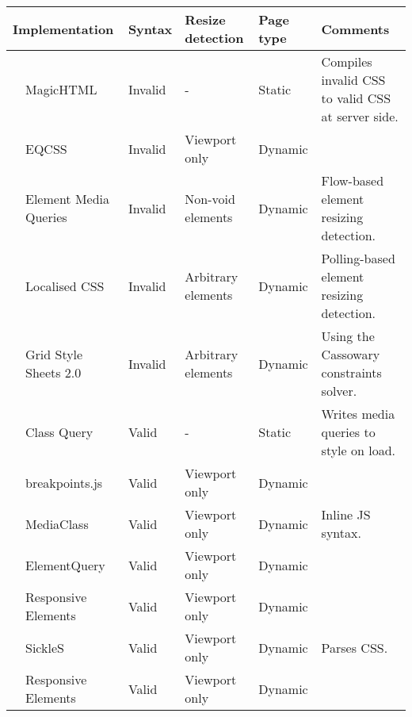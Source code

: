 \documentclass{acm_proc_article-sp}
\newcommand{\gls}[1]{#1}
\begin{document}
\begin{table*}[ht!]\center
    \tiny
    \begin{tabular}[t]{ l p{3cm} l l l p{3cm} }
      \multicolumn{2}{l}{Implementation} & Syntax & Resize detection & Page type & Comments \\
      \hline
      \cite{eq_imp_magichtml} &             MagicHTML &                                   Invalid &   - &                          Static &    Compiles invalid CSS to valid CSS at server side. \\
      \cite{eq_imp_eqcss} &                 EQCSS &                                       Invalid &   Viewport only &              Dynamic     \\
      \cite{eq_imp_prollyfill-min-width} &  Element Media Queries &                       Invalid &   Non-void elements &   Dynamic &   Flow-based element resizing detection. \\
      \cite{eq_imp_localised-css} &         Localised CSS &                               Invalid &   Arbitrary elements &  Dynamic &   Polling-based element resizing detection. \\
      \cite{eq_imp_gss} &                   Grid Style Sheets 2.0 &                       Invalid &   Arbitrary elements &  Dynamic &   Using the Cassowary constraints solver. \\
      \cite{eq_imp_classquery} &            Class Query &                                 Valid &     - &                          Static &    Writes \gls{media queries} to style on load. \\
      \cite{eq_imp_breakpointsjs} &         breakpoints.js &                              Valid &     Viewport only &              Dynamic &   \\
      \cite{eq_imp_mediaclass} &            MediaClass &                                  Valid &     Viewport only &              Dynamic &   Inline JS syntax. \\
      \cite{eq_imp_elementquery} &          ElementQuery &                                Valid &     Viewport only &              Dynamic &   \\
      \cite{eq_imp_responsive-elements} &   Responsive Elements &                         Valid &     Viewport only &              Dynamic &   \\
      \cite{eq_imp_sickles} &               SickleS &                                     Valid &     Viewport only &              Dynamic &   Parses CSS. \\
      \cite{eq_imp_responsive-elements-2} & Responsive Elements &                         Valid &     Viewport only &              Dynamic &   \\ 

\end{tabular}
\end{table*}
\end{document}
